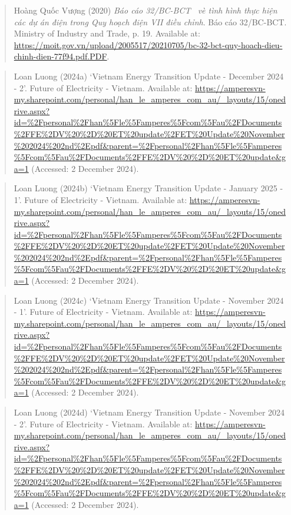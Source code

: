 \documentclass[a4paper,11pt]{report}
\begin{document}
\begin{quote}
Hoàng Quốc Vượng (2020) \emph{Báo cáo 32/BC-BCT~ vè tình hình thực hiện các dự án điện trong Quy hoạch điện VII điều chỉnh}. Báo cáo 32/BC-BCT. Ministry of Industry and Trade, p. 19. Available at: \url{https://moit.gov.vn/upload/2005517/20210705/bc-32-bct-quy-hoach-dieu-chinh-dien-77f94.pdf.PDF}.
\end{quote}

\begin{quote}
Loan Luong (2024a) `Vietnam Energy Transition Update - December 2024 - 2'. Future of Electricity - Vietnam. Available at: \url{https://amperesvn-my.sharepoint.com/personal/han_le_amperes_com_au/_layouts/15/onedrive.aspx?id=\%2Fpersonal\%2Fhan\%5Fle\%5Famperes\%5Fcom\%5Fau\%2FDocuments\%2FFE\%2DV\%20\%2D\%20ET\%20update\%2FET\%20Update\%20November\%202024\%202nd\%2Epdf\&parent=\%2Fpersonal\%2Fhan\%5Fle\%5Famperes\%5Fcom\%5Fau\%2FDocuments\%2FFE\%2DV\%20\%2D\%20ET\%20update\&ga=1} (Accessed: 2 December 2024).
\end{quote}

\begin{quote}
Loan Luong (2024b) `Vietnam Energy Transition Update - January 2025 - 1'. Future of Electricity - Vietnam. Available at: \url{https://amperesvn-my.sharepoint.com/personal/han_le_amperes_com_au/_layouts/15/onedrive.aspx?id=\%2Fpersonal\%2Fhan\%5Fle\%5Famperes\%5Fcom\%5Fau\%2FDocuments\%2FFE\%2DV\%20\%2D\%20ET\%20update\%2FET\%20Update\%20November\%202024\%202nd\%2Epdf\&parent=\%2Fpersonal\%2Fhan\%5Fle\%5Famperes\%5Fcom\%5Fau\%2FDocuments\%2FFE\%2DV\%20\%2D\%20ET\%20update\&ga=1} (Accessed: 2 December 2024).
\end{quote}

\begin{quote}
Loan Luong (2024c) `Vietnam Energy Transition Update - November 2024 - 1'. Future of Electricity - Vietnam. Available at: \url{https://amperesvn-my.sharepoint.com/personal/han_le_amperes_com_au/_layouts/15/onedrive.aspx?id=\%2Fpersonal\%2Fhan\%5Fle\%5Famperes\%5Fcom\%5Fau\%2FDocuments\%2FFE\%2DV\%20\%2D\%20ET\%20update\%2FET\%20Update\%20November\%202024\%202nd\%2Epdf\&parent=\%2Fpersonal\%2Fhan\%5Fle\%5Famperes\%5Fcom\%5Fau\%2FDocuments\%2FFE\%2DV\%20\%2D\%20ET\%20update\&ga=1} (Accessed: 2 December 2024).
\end{quote}

\begin{quote}
Loan Luong (2024d) `Vietnam Energy Transition Update - November 2024 - 2'. Future of Electricity - Vietnam. Available at: \url{https://amperesvn-my.sharepoint.com/personal/han_le_amperes_com_au/_layouts/15/onedrive.aspx?id=\%2Fpersonal\%2Fhan\%5Fle\%5Famperes\%5Fcom\%5Fau\%2FDocuments\%2FFE\%2DV\%20\%2D\%20ET\%20update\%2FET\%20Update\%20November\%202024\%202nd\%2Epdf\&parent=\%2Fpersonal\%2Fhan\%5Fle\%5Famperes\%5Fcom\%5Fau\%2FDocuments\%2FFE\%2DV\%20\%2D\%20ET\%20update\&ga=1} (Accessed: 2 December 2024).
\end{quote}
\end{document}

